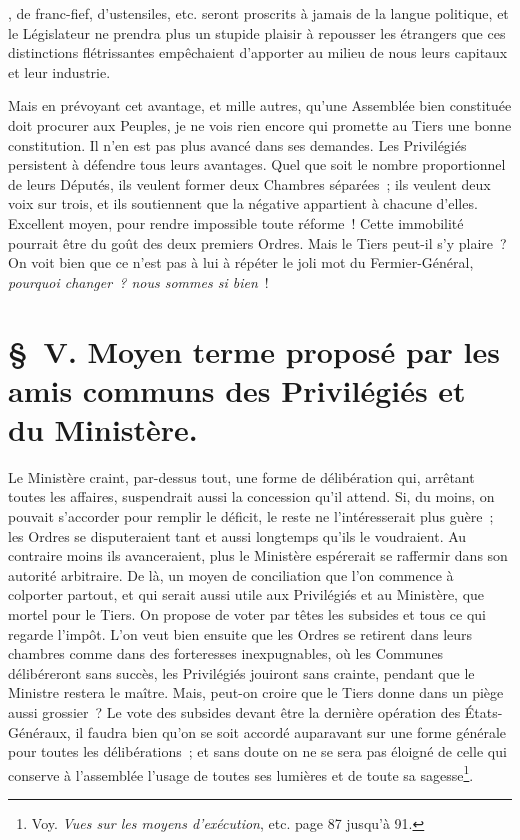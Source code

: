 \documentclass[french,twoside]{book} %
\begin{document}
{}, de franc-fief, d’ustensiles, etc. seront proscrits à jamais de la langue politique, et le Législateur ne prendra plus un stupide plaisir à repousser les étrangers que ces distinctions flétrissantes empêchaient d’apporter au milieu de nous leurs capitaux et leur industrie.\par
Mais en prévoyant cet avantage, et mille autres, qu’une Assemblée bien constituée doit procurer aux Peuples, je ne vois rien encore qui promette au Tiers une bonne constitution. Il n’en est pas plus avancé dans ses demandes. Les Privilégiés persistent à défendre tous leurs avantages. Quel que soit le nombre proportionnel de leurs Députés, ils veulent former deux Chambres séparées ; ils veulent deux voix sur trois, et ils soutiennent que la négative appartient à chacune d’elles. Excellent moyen, pour rendre impossible toute réforme ! Cette immobilité pourrait être du goût des deux premiers Ordres. Mais le Tiers peut-il s’y plaire ? On voit bien que ce n’est pas à lui à répéter le joli mot du Fermier-Général, {\itshape pourquoi changer ? nous sommes si bien} !
\section[{§ V. Moyen terme proposé par les amis communs des Privilégiés et du Ministère.}]{§ V. Moyen terme proposé par les amis communs des Privilégiés et du Ministère.}
\noindent Le Ministère craint, par-dessus tout, une forme de délibération qui, arrêtant toutes les affaires, suspendrait aussi la concession qu’il attend. Si, du moins, on pouvait s’accorder pour remplir le déficit, le reste ne l’intéresserait plus guère ; les Ordres se disputeraient tant et aussi longtemps qu’ils le voudraient. Au contraire moins ils avanceraient, plus le Ministère espérerait se raffermir dans son autorité arbitraire. De là, un moyen de conciliation que l’on commence à colporter partout, et qui serait aussi utile aux Privilégiés et au Ministère, que mortel pour le Tiers. On propose de voter par têtes les subsides et tous ce qui regarde l’impôt. L’on veut bien ensuite que les Ordres se retirent dans leurs chambres comme dans des forteresses inexpugnables, où les Communes délibéreront sans succès, les Privilégiés jouiront sans crainte, pendant que le Ministre restera le maître. Mais, peut-on croire que le Tiers donne dans un piège aussi grossier ? Le vote des subsides devant être la dernière opération des États-Généraux, il faudra bien qu’on se soit accordé auparavant sur une forme générale pour toutes les délibérations ; et sans doute on ne se sera pas éloigné de celle qui conserve à l’assemblée l’usage de toutes ses lumières et de toute sa sagesse\footnote{Voy. {\itshape Vues sur les moyens d’exécution}, etc. page 87 jusqu’à 91.}.
\end{document}
